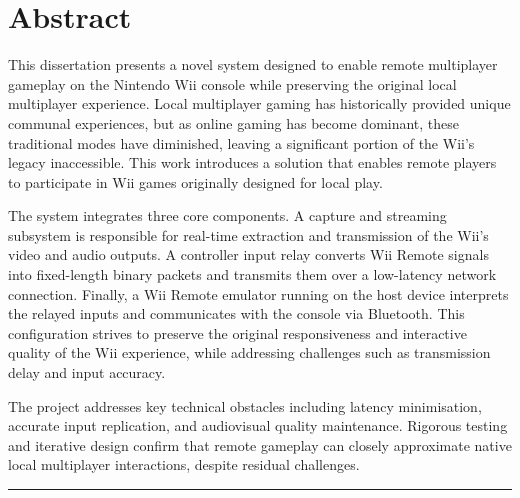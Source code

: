 \chapter*{Abstract}

This dissertation presents a novel system designed to enable remote multiplayer
gameplay on the Nintendo Wii console while preserving the original local
multiplayer experience. Local multiplayer gaming has historically provided
unique communal experiences, but as online gaming has become dominant, these
traditional modes have diminished, leaving a significant portion of the Wii’s
legacy inaccessible. This work introduces a solution that enables remote players
to participate in Wii games originally designed for local play.

The system integrates three core components. A capture and streaming subsystem
is responsible for real-time extraction and transmission of the Wii’s video and
audio outputs. A controller input relay converts Wii Remote signals into
fixed-length binary packets and transmits them over a low-latency network
connection. Finally, a Wii Remote emulator running on the host device interprets
the relayed inputs and communicates with the console via Bluetooth. This
configuration strives to preserve the original responsiveness and interactive
quality of the Wii experience, while addressing challenges such as transmission
delay and input accuracy.

The project addresses key technical obstacles including latency minimisation,
accurate input replication, and audiovisual quality maintenance. Rigorous
testing and iterative design confirm that remote gameplay can closely
approximate native local multiplayer interactions, despite residual challenges.

\begin{center}
	\noindent\rule{8cm}{0.4pt}
\end{center}
